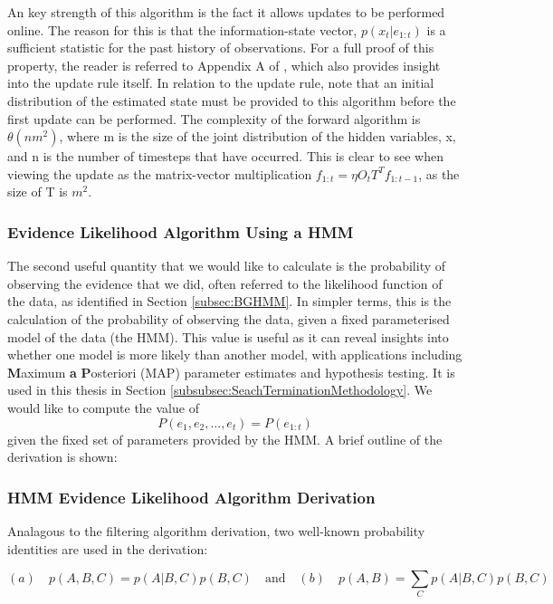 An key strength of this algorithm is the fact it allows updates to be performed online. The reason for this is that the information-state vector, $p(x_t | e_{1:t})$ is a sufficient statistic for the past history of observations. For a full proof of this property, the reader is referred to Appendix A of \cite{Smallwood1973TheHorizon}, which also provides insight into the update rule itself. In relation to the update rule, note that an initial distribution of the estimated state must be provided to this algorithm before the first update can be performed. The complexity of the forward algorithm is $\theta (nm^2)$, where m is the size of the joint distribution of the hidden variables, x, and n is the number of timesteps that have occurred. This is clear to see when viewing the update as the matrix-vector multiplication $f_{1:t} = \eta O_{t} T^{T} f_{1:t-1}$, as the size of T is $m^2$.






\subsubsection{Evidence Likelihood Algorithm Using a HMM}\label{subsubsec:EvLikelihood}
The second useful quantity that we would like to calculate is the probability of observing the evidence that we did, often referred to the likelihood function of the data, as identified in Section \ref{subsec:BGHMM}. In simpler terms, this is the calculation of the probability of observing the data, given a fixed parameterised model of the data (the HMM). This value is useful as it can reveal insights into whether one model is more likely than another model, with applications including \textbf{M}aximum \textbf{a} \textbf{P}osteriori (MAP) parameter estimates and hypothesis testing. It is used in this thesis in Section \ref{subsubsec:SeachTerminationMethodology}. We would like to compute the value of
\[P(e_1, e_2, ..., e_t) = P(e_{1:t})\]
given the fixed set of parameters provided by the HMM. A brief outline of the derivation is shown: 


\subsubsection{HMM Evidence Likelihood Algorithm Derivation}\label{subsubsec:BGEvidenceLikelihood}

Analagous to the filtering algorithm derivation, two well-known probability identities are used in the derivation: 
\begin{center}
\end{center}
\[(a) \quad p(A, B, C) = p(A | B, C) p(B, C) \quad \text{and} \quad (b) \quad p(A, B) = \sum_{C}{p(A | B, C)p(B, C)}\]

